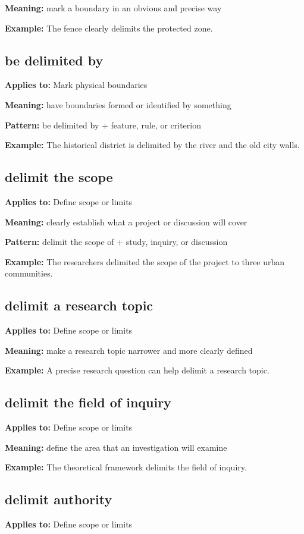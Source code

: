 \documentclass[11pt]{article}
\begin{document}
\textbf{Meaning:} mark a boundary in an obvious and precise way

\textbf{Example:} The fence clearly delimits the protected zone.

\subsection{be delimited by}
\textbf{Applies to:} Mark physical boundaries

\textbf{Meaning:} have boundaries formed or identified by something

\textbf{Pattern:} be delimited by + feature, rule, or criterion

\textbf{Example:} The historical district is delimited by the river and the old city walls.

\subsection{delimit the scope}
\textbf{Applies to:} Define scope or limits

\textbf{Meaning:} clearly establish what a project or discussion will cover

\textbf{Pattern:} delimit the scope of + study, inquiry, or discussion

\textbf{Example:} The researchers delimited the scope of the project to three urban communities.

\subsection{delimit a research topic}
\textbf{Applies to:} Define scope or limits

\textbf{Meaning:} make a research topic narrower and more clearly defined

\textbf{Example:} A precise research question can help delimit a research topic.

\subsection{delimit the field of inquiry}
\textbf{Applies to:} Define scope or limits

\textbf{Meaning:} define the area that an investigation will examine

\textbf{Example:} The theoretical framework delimits the field of inquiry.

\subsection{delimit authority}
\textbf{Applies to:} Define scope or limits
\end{document}
